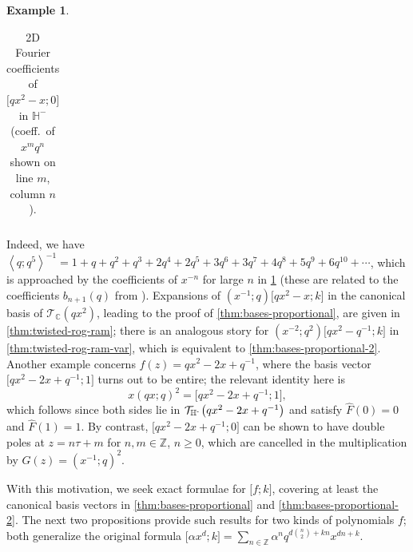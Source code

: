 \documentclass[reqno,11pt]{amsart}
\theoremstyle{definition}
\newtheorem{example}[theorem]{Example}
\theoremstyle{remark}
\numberwithin{equation}{section}
\newcommand{\Z}{\mathbb{Z}}
\newcommand{\C}{\mathbb{C}}
\renewcommand{\H}{{\mathbb{H}}}
\newcommand{\Hminus}{{\mathbb{H}^{\textnormal{-}\hspace{-0.03cm}}}}
\newcommand{\mT}{\mathcal{T}}
\newcommand{\la}{\left\langle}
\newcommand{\ra}{\right\rangle}
\newcommand{\vect}[2]{\big[{#1};{#2}\big]}
\renewcommand{\hat}{\widehat}
\begin{document}
\begin{example}
\begin{table}[ht]
\begin{tabular}{r|rrrrrrrrrrrrrrrrrrrrrrrrrrrrrrrrrrrrrrrrrrrrrrrrrrrrrrrrrrrrrrrrrrrrrrrrrrrrrrrrrrrrrr}
    \end{tabular}
    \caption{2D Fourier coefficients of $\vect{qx^2-x}{0}$ in $\H^-$ (coeff.\ of $x^m q^n$ shown on line $m$, column $n$).}
    \label{tbl:plot1}
\end{table}%
Indeed, we have $\la q; q^5 \ra^{-1} = 1 + q + q^2 + q^3 + 2q^4 + 2q^5 + 3q^6 + 3q^7 + 4q^8 + 5q^9 + 6q^{10} + \cdots$, which is approached by the coefficients of $x^{-n}$ for large $n$ in \cref{tbl:plot1} (these are related to the coefficients $b_{n+1}(q)$ from \cite{garrett1999variants}). Expansions of $\left(x^{-1}; q\right)\vect{qx^2 - x}{k}$ in the canonical basis of $\mT_\C\left(qx^2\right)$, leading to the proof of \cref{thm:bases-proportional}, are given in \cref{thm:twisted-rog-ram}; there is an analogous story for $\left(x^{-2}; q^2\right)\vect{qx^2 - q^{-1}}{k}$ in \cref{thm:twisted-rog-ram-var}, which is equivalent to \cref{thm:bases-proportional-2}. Another example concerns $f(z) = qx^2 - 2x + q^{-1}$, where the basis vector $\vect{qx^2-2x+q^{-1}}{1}$ turns out to be entire; the relevant identity here is
\[
    x(qx; q)^2 = \vect{qx^2-2x+q^{-1}}{1},
\]
which follows since both sides lie in $\mT_\Hminus\left(qx^2 - 2x + q^{-1}\right)$ and satisfy $\hat{F}(0) = 0$ and $\hat{F}(1) = 1$. By contrast, $\vect{qx^2 - 2x + q^{-1}}{0}$ can be shown to have double poles at $z = n\tau + m$ for $n, m \in \Z$, $n \ge 0$, which are cancelled in the multiplication by $G(z) = \left(x^{-1}; q\right)^2$.
\end{example}

With this motivation, we seek exact formulae for $\vect{f}{k}$, covering at least the canonical basis vectors in \cref{thm:bases-proportional} and \cref{thm:bases-proportional-2}. The next two propositions provide such results for two kinds of polynomials $f$; both generalize the original formula $\vect{\alpha x^d}{k} = \sum_{n \in \Z} \alpha^n q^{d\binom{n}{2} + kn} x^{dn+k}$.
\end{document}
